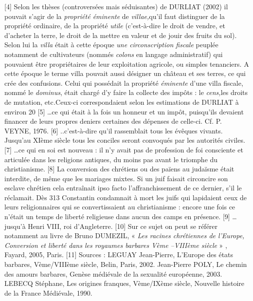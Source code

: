 [4] Selon les thèses (controversées mais séduisantes) de DURLIAT (2002) il pouvait s'agir de la \emph{propriété éminente} de \emph{villae,}qu'il faut distinguer de la propriété ordinaire, de la propriété \emph{utile} (c'est-à-dire le droit de vendre, et d'acheter la terre, le droit de la mettre en valeur et de jouir des fruits du sol). Selon lui la \emph{villa} était à cette époque \emph{une circonscription fiscale} peuplée notamment de cultivateurs (nommés \emph{colons} en langage administratif) qui pouvaient être propriétaires de leur exploitation agricole, ou simples tenanciers. A cette époque le terme villa pouvait aussi désigner un château et ses terres, ce qui crée des confusions. Celui qui possédait la propriété \emph{éminente} d'une villa fiscale, nommé le \emph{dominus}, était chargé d'y faire la collecte des impôts : le\emph{ cens,}les droits de mutation, etc\emph{.}Ceux-ci correspondaient selon les estimations de DURLIAT à environ 20 %
[5] …ce qui était à la fois un honneur et un impôt, puisqu'ils devaient financer de leurs propres deniers certaines des dépenses de celle-ci. Cf. P. VEYNE, 1976.
[6] ..c'est-à-dire qu'il rassemblait tous les évêques vivants. Jusqu'au XIème siècle tous les conciles seront convoqués par les autorités civiles.
[7] …ce qui en soi est nouveau : il n'y avait pas de profession de foi consciente et articulée dans les religions antiques, du moins pas avant le triomphe du christianisme.
[8] La conversion des chrétiens ou des païens au judaïsme était interdite, de même que les mariages mixtes. Si un juif faisait circoncire son esclave chrétien cela entraînait ipso facto l'affranchissement de ce dernier, s'il le réclamait. Dès 313 Constantin condamnait à mort les juifs qui lapidaient ceux de leurs religionnaires qui se convertissaient au christianisme : encore une fois ce n'était un temps de liberté religieuse dans aucun des camps en présence.
[9] … jusqu'à Henri VIII, roi d'Angleterre.
[10] Sur ce sujet on peut se référer notamment au livre de Bruno DUMEZIL, « \emph{Les racines chrétiennes de l'Europe, Conversion et liberté dans les royaumes barbares Vème –VIIIème siècle} » , Fayard, 2005, Paris.
[11] Sources : LEGUAY Jean-Pierre, L'Europe des états barbares, Vème/VIIIème siècle, Belin, Paris, 2002. Jean-Pierre POLY, Le chemin des amours barbares, Genèse médiévale de la sexualité européenne, 2003. LEBECQ Stéphane, Les origines franques, Vème/IXème siècle, Nouvelle histoire de la France Médiévale, 1990.